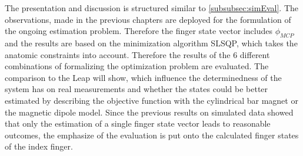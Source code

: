 The presentation and discussion is structured similar to \ref{subsubsec:simEval}. The observations, made in the previous chapters are deployed for the formulation of the ongoing estimation problem. Therefore the finger state vector includes $ \phi_{MCP} $ and the results are based on the minimization algorithm \ac{SLSQP}, which takes the anatomic constraints into account. Therefore the results of the 6 different combinations of formalizing the optimization problem are evaluated. The comparison to the Leap will show, which influence the determinedness of the system has on real measurements and whether the states could be better estimated by describing the objective function with the cylindrical bar magnet or the magnetic dipole model. Since the previous results on simulated data showed that only the estimation of a single finger state vector leads to reasonable outcomes, the emphasize of the evaluation is put onto the calculated finger states of the index finger.

